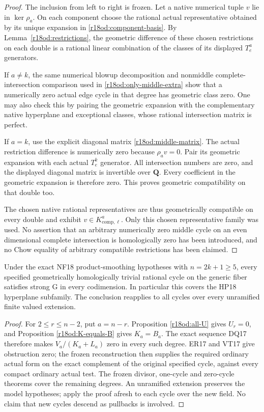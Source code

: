 \begin{proof}
The inclusion from left to right is frozen.  Let a native
numerical tuple $v$ lie in $\ker\rho_a$.  On each component
choose the rational actual representative obtained by its
unique expansion in \eqref{r18od:component-basis}.
By Lemma~\ref{r18od:restrictions}, the geometric difference
of these chosen restrictions on each double is a rational
linear combination of the classes of its displayed $T_e^a$
generators.

If $a\ne k$, the same numerical blowup decomposition and
nonmiddle complete-intersection comparison used in
\eqref{r18od:only-middle-extra} show that a numerically zero
actual edge cycle in that degree has geometric class zero.
One may also check this by pairing the geometric expansion
with the complementary native hyperplane and exceptional
classes, whose rational intersection matrix is perfect.

If $a=k$, use the explicit diagonal matrix
\eqref{r18od:middle-matrix}.  The actual restriction difference
is numerically zero because $\rho_a v=0$.  Pair its geometric
expansion with each actual $T_e^k$ generator.  All intersection
numbers are zero, and the displayed diagonal matrix is
invertible over $\mathbf Q$.  Every coefficient in the
geometric expansion is therefore zero.  This proves geometric
compatibility on that double too.

The chosen native rational representatives are thus geometrically
compatible on every double and exhibit $v\in K_{\mathrm{comp},\ell}^a$.
Only this chosen representative family was used.  No assertion
that an arbitrary numerically zero middle cycle on an even
dimensional complete intersection is homologically zero has
been introduced, and no Chow equality of arbitrary compatible
restrictions has been claimed.
\end{proof}

\begin{theorem}
\label{r18od:full-G}
Under the exact NF18 product-smoothing hypotheses with
$n=2k+1\ge5$, every specified geometrically homologically
trivial rational cycle on the generic fiber satisfies strong G
in every codimension.  In particular this covers the HP18
hyperplane subfamily.  The conclusion reapplies to all cycles
over every unramified finite valued extension.
\end{theorem}

\begin{proof}
For $2\le r\le n-2$, put $a=n-r$.  Proposition
\ref{r18od:all-U} gives $U_r=0$, and Proposition
\ref{r18od:K-equals-B} gives $K_a=B_a$.
The exact sequence DQ17 therefore makes
$V_a/(K_a+L_a)$ zero in every such degree.
ER17 and VT17 give obstruction zero; the frozen reconstruction
then supplies the required ordinary actual form on the exact
complement of the original specified cycle, against every
compact ordinary actual test.  The frozen divisor, one-cycle
and zero-cycle theorems cover the remaining degrees.
An unramified extension preserves the model hypotheses;
apply the proof afresh to each cycle over the new field.
No claim that new cycles descend as pullbacks is involved.
\end{proof}

